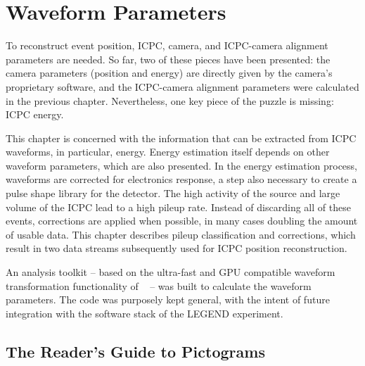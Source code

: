 \chapter{Waveform Parameters}\label{chap:param}

To reconstruct event position, ICPC, camera, and ICPC-camera alignment parameters are needed. So far, two of these pieces have been presented: the camera parameters (position and energy) are directly given by the camera's proprietary software, and the ICPC-camera alignment parameters were calculated in the previous chapter. Nevertheless, one key piece of the puzzle is missing: ICPC energy.

This chapter is concerned with the information that can be extracted from ICPC waveforms, in particular, energy. Energy estimation itself depends on other waveform parameters, which are also presented. In the energy estimation process, waveforms are corrected for electronics response, a step also necessary to create a pulse shape library for the detector. The high activity of the \CsS{} source and large volume of the ICPC lead to a high pileup rate. Instead of discarding all of these events, corrections are applied when possible, in many cases doubling the amount of usable data. This chapter describes pileup classification and corrections, which result in two data streams subsequently used for ICPC position reconstruction.

An analysis toolkit -- based on the ultra-fast and GPU compatible waveform transformation functionality of ~\cite{rddsp} -- was built to calculate the waveform parameters. The code was purposely kept general, with the intent of future integration with the \julia{} software stack of the LEGEND experiment.

\section{The Reader's Guide to Pictograms}

